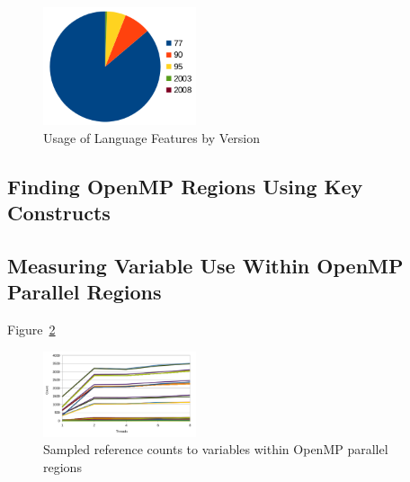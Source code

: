 \begin{figure}
\begin{center}
\includegraphics[width=0.4\textwidth]{images/cp2k-fortran-versions.png}
\end{center}
\caption{Usage of Language Features by Version}
\label{fig:fortran-versions}
\end{figure}

\subsection{Finding OpenMP Regions Using Key Constructs}

\subsection{Measuring Variable Use Within OpenMP Parallel Regions}

Figure~\ref{fig:openmp-refcount}

\begin{figure}
\begin{center}
\includegraphics[width=0.4\textwidth]{images/cp2k-omp-inc-full.pdf}
\end{center}
\caption{Sampled reference counts to variables within OpenMP parallel regions}
\label{fig:openmp-refcount}
\end{figure}
